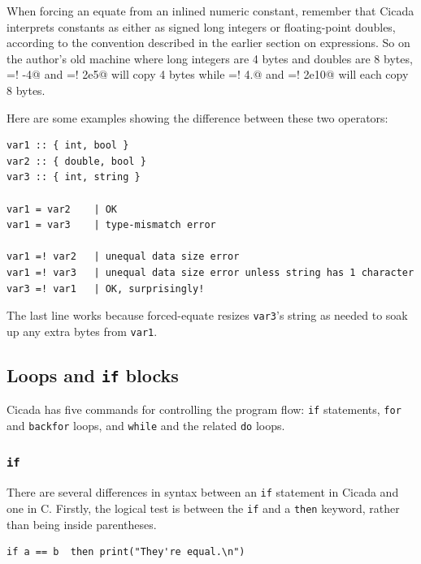 \documentclass{article}
\newenvironment{code}{
       \begin{list}{}{
               \setlength{\leftmargin}{.4in}
               \setlength{\rightmargin}{0in}
               \setlength{\topsep}{.2in}
       }
       \small
       \item[] }
       { \end{list}   }
\begin{document}
When forcing an equate from an inlined numeric constant, remember that Cicada interprets constants as either as signed long integers or floating-point doubles, according to the convention described in the earlier section on expressions.  So on the author's old machine where long integers are 4 bytes and doubles are 8 bytes, \verb@a =! -4@ and \verb@a =! 2e5@ will copy 4 bytes while \verb@a =! 4.@ and \verb@a =! 2e10@ will each copy 8 bytes.

Here are some examples showing the difference between these two operators:

\begin{code} \begin{verbatim}
var1 :: { int, bool }
var2 :: { double, bool }
var3 :: { int, string }

var1 = var2    | OK
var1 = var3    | type-mismatch error

var1 =! var2   | unequal data size error
var1 =! var3   | unequal data size error unless string has 1 character
var3 =! var1   | OK, surprisingly!
\end{verbatim} \end{code}

\noindent The last line works because forced-equate resizes \verb#var3#'s string as needed to soak up any extra bytes from \verb#var1#.






\subsection{Loops and \texttt{if} blocks} 

Cicada has five commands for controlling the program flow:  \texttt{if} statements, \texttt{for} and \verb$backfor$ loops, and \texttt{while} and the related \texttt{do} loops.


\subsubsection{\texttt{if}} 

There are several differences in syntax between an \texttt{if} statement in Cicada and one in C.  Firstly, the logical test is between the \verb#if# and a \verb#then# keyword, rather than being inside parentheses.

\begin{code} \begin{verbatim}
if a == b  then print("They're equal.\n")
\end{verbatim} \end{code}
\end{document}
